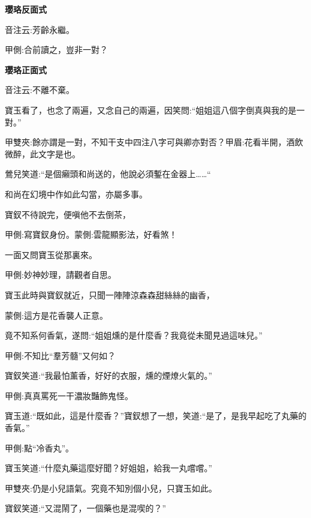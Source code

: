 \begin{qute}

    \begin{parag}
        \textbf{瓔珞反面式}
    \end{parag}


    \begin{parag}
        音注云:芳齡永繼。\begin{note}甲側:合前讀之，豈非一對？\end{note}
    \end{parag}


    \begin{parag}
        \textbf{瓔珞正面式}
    \end{parag}


    \begin{parag}
        音注云:不離不棄。
    \end{parag}
\end{qute}


\begin{parag}
    寶玉看了，也念了兩遍，又念自己的兩遍，因笑問:“姐姐這八個字倒真與我的是一對。”\begin{note}甲雙夾:餘亦謂是一對，不知干支中四注八字可與卿亦對否？甲眉:花看半開，酒飲微醉，此文字是也。\end{note}鶯兒笑道:“是個癩頭和尚送的，他說必須鏨在金器上……“\begin{note}和尚在幻境中作如此勾當，亦屬多事。\end{note}寶釵不待說完，便嗔他不去倒茶，\begin{note}甲側:寫寶釵身份。蒙側:雲龍顯影法，好看煞！\end{note}一面又問寶玉從那裏來。\begin{note}甲側:妙神妙理，請觀者自思。\end{note}
\end{parag}


\begin{parag}
    寶玉此時與寶釵就近，只聞一陣陣涼森森甜絲絲的幽香，\begin{note}蒙側:這方是花香襲人正意。\end{note}竟不知系何香氣，遂問:“姐姐燻的是什麼香？我竟從未聞見過這味兒。”\begin{note}甲側:不知比“羣芳髓”又何如？\end{note}寶釵笑道:“我最怕薰香，好好的衣服，燻的煙燎火氣的。”\begin{note}甲側:真真罵死一干濃妝豔飾鬼怪。\end{note}寶玉道:“既如此，這是什麼香？”寶釵想了一想，笑道:“是了，是我早起吃了丸藥的香氣。”\begin{note}甲側:點“冷香丸”。\end{note}寶玉笑道:“什麼丸藥這麼好聞？好姐姐，給我一丸嚐嚐。”\begin{note}甲雙夾:仍是小兒語氣。究竟不知別個小兒，只寶玉如此。\end{note}寶釵笑道:“又混鬧了，一個藥也是混喫的？”
\end{parag}


